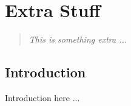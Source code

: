 \chapter{Extra Stuff}\label{appx:extrastuff}

\begin{quote}
{\it This is something extra ...}
\end{quote}

\section{Introduction}\label{appx:extrastuff:intro}

Introduction here ...
